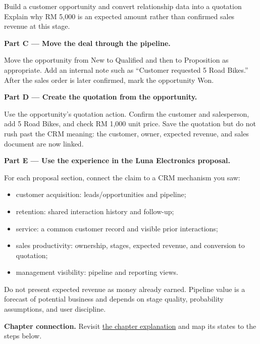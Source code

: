 \begin{labproject}{Build a customer opportunity and convert relationship data into a quotation}
Explain why RM 5,000 is an expected amount rather than confirmed sales revenue at this stage.

\medskip\noindent\textbf{Part C --- Move the deal through the pipeline.}

Move the opportunity from New to Qualified and then to Proposition as appropriate. Add an internal note such as ``Customer requested 5 Road Bikes.'' After the sales order is later confirmed, mark the opportunity Won.

\medskip\noindent\textbf{Part D --- Create the quotation from the opportunity.}

Use the opportunity's quotation action. Confirm the customer and salesperson, add 5 Road Bikes, and check RM 1,000 unit price. Save the quotation but do not rush past the CRM meaning: the customer, owner, expected revenue, and sales document are now linked.

\medskip\noindent\textbf{Part E --- Use the experience in the Luna Electronics proposal.}

For each proposal section, connect the claim to a CRM mechanism you saw:
\begin{itemize}
  \item customer acquisition: leads/opportunities and pipeline;
  \item retention: shared interaction history and follow-up;
  \item service: a common customer record and visible prior interactions;
  \item sales productivity: ownership, stages, expected revenue, and conversion to quotation;
  \item management visibility: pipeline and reporting views.
\end{itemize}

\begin{pitfall}
Do not present expected revenue as money already earned. Pipeline value is a forecast of potential business and depends on stage quality, probability assumptions, and user discipline.
\end{pitfall}
\end{labproject}

\textbf{Chapter connection.} Revisit \hyperref[ch:crm]{the chapter explanation} and map its states to the steps below.




